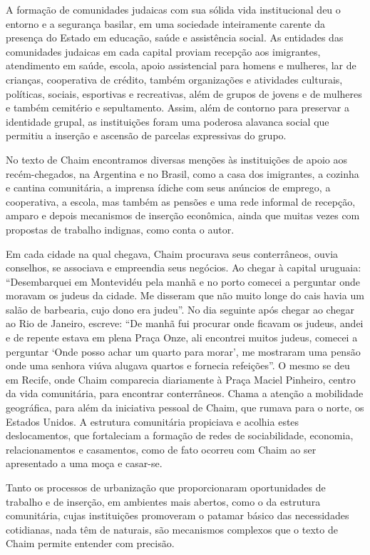 A formação de comunidades judaicas com sua sólida vida institucional deu
o entorno e a segurança basilar, em uma sociedade inteiramente carente
da presença do Estado em educação, saúde e assistência social. As
entidades das comunidades judaicas em cada capital proviam recepção aos
imigrantes, atendimento em saúde, escola, apoio assistencial para homens
e mulheres, lar de crianças, cooperativa de crédito, também organizações
e atividades culturais, políticas, sociais, esportivas e recreativas,
além de grupos de jovens e de mulheres e também cemitério e
sepultamento. Assim, além de contorno para preservar a identidade
grupal, as instituições foram uma poderosa alavanca social que permitiu
a inserção e ascensão de parcelas expressivas do grupo.

No texto de Chaim encontramos diversas menções às instituições de apoio
aos recém-chegados, na Argentina e no Brasil, como a casa dos
imigrantes, a cozinha e cantina comunitária, a imprensa ídiche com seus
anúncios de emprego, a cooperativa, a escola, mas também as pensões e
uma rede informal de recepção, amparo e depois mecanismos de inserção
econômica, ainda que muitas vezes com propostas de trabalho indignas,
como conta o autor.

Em cada cidade na qual chegava, Chaim procurava seus conterrâneos, ouvia
conselhos, se associava e empreendia seus negócios. Ao chegar à capital
uruguaia: ``Desembarquei em Montevidéu pela manhã e no porto comecei a
perguntar onde moravam os judeus da cidade. Me disseram que não muito
longe do cais havia um salão de barbearia, cujo dono era judeu''. No dia
seguinte após chegar ao chegar ao Rio de Janeiro, escreve: ``De manhã
fui procurar onde ficavam os judeus, andei e de repente estava em plena
Praça Onze, ali encontrei muitos judeus, comecei a perguntar `Onde posso
achar um quarto para morar', me mostraram uma pensão onde uma senhora
viúva alugava quartos e fornecia refeições''. O mesmo se deu em Recife,
onde Chaim comparecia diariamente à Praça Maciel Pinheiro, centro da
vida comunitária, para encontrar conterrâneos. Chama a atenção a
mobilidade geográfica, para além da iniciativa pessoal de Chaim, que
rumava para o norte, os Estados Unidos. A estrutura comunitária
propiciava e acolhia estes deslocamentos, que fortaleciam a formação de
redes de sociabilidade, economia, relacionamentos e casamentos, como de
fato ocorreu com Chaim ao ser apresentado a uma moça e casar-se.

Tanto os processos de urbanização que proporcionaram oportunidades de
trabalho e de inserção, em ambientes mais abertos, como o da estrutura
comunitária, cujas instituições promoveram o patamar básico das
necessidades cotidianas, nada têm de naturais, são mecanismos complexos
que o texto de Chaim permite entender com precisão.

